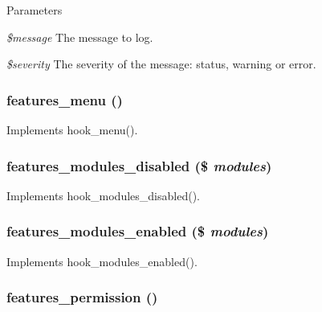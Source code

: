 \begin{DoxyParams}{Parameters}
\item[{\em \$message}]The message to log. \item[{\em \$severity}]The severity of the message: status, warning or error. \end{DoxyParams}
\hypertarget{features_8module_a2f3b3fc6d67373f91feb6e2e9d45c0f0}{
\subsubsection[{features\_\-menu}]{\setlength{\rightskip}{0pt plus 5cm}features\_\-menu ()}}
\label{features_8module_a2f3b3fc6d67373f91feb6e2e9d45c0f0}
Implements hook\_\-menu(). \hypertarget{features_8module_ab4015ad6546e314fe3e6e8ed0d436c05}{
\subsubsection[{features\_\-modules\_\-disabled}]{\setlength{\rightskip}{0pt plus 5cm}features\_\-modules\_\-disabled (\$ {\em modules})}}
\label{features_8module_ab4015ad6546e314fe3e6e8ed0d436c05}
Implements hook\_\-modules\_\-disabled(). \hypertarget{features_8module_a124f4a6b7d4a6678f703597bad15f6d7}{
\subsubsection[{features\_\-modules\_\-enabled}]{\setlength{\rightskip}{0pt plus 5cm}features\_\-modules\_\-enabled (\$ {\em modules})}}
\label{features_8module_a124f4a6b7d4a6678f703597bad15f6d7}
Implements hook\_\-modules\_\-enabled(). \hypertarget{features_8module_a8798acbb3fe11426ba45f33a83e055b6}{
\subsubsection[{features\_\-permission}]{\setlength{\rightskip}{0pt plus 5cm}features\_\-permission ()}}

